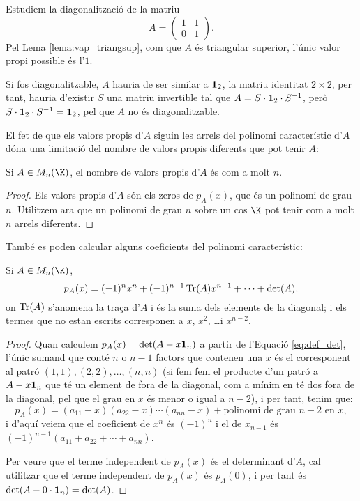 \begin{exemple}\label{exem:mat1101}
Estudiem la diagonalització de la matriu
$$
A=\begin{pmatrix}
1 &  1 \\ 0 & 1
\end{pmatrix}.
$$
Pel Lema \ref{lema:vap_triangsup}, com que $A$ és triangular superior, l'únic valor propi possible és l'$1$.

Si fos diagonalitzable, $A$ hauria de ser similar a $\mathbf{1}_2$, la matriu identitat $2\times 2$, per tant, hauria d'existir $S$ una matriu invertible tal que $A=S\cdot\mathbf{1}_2\cdot S^{-1}$, però $S\cdot \mathbf{1}_2 \cdot S^{-1}=\mathbf{1}_2$, pel que $A$ no és diagonalitzable.
\end{exemple}

El fet de que els valors propis d'$A$ siguin les arrels del polinomi característic d'$A$ dóna una limitació del nombre de valors propis diferents que pot tenir $A$:
\begin{lema}
Si $A\in M_n(\K)$, el nombre de valors propis d'$A$ és com a molt $n$.
\end{lema}
\begin{proof}
Els valors propis d'$A$ són els zeros de $p_A(x)$, que és un polinomi de grau $n$. Utilitzem ara que un polinomi de grau $n$ sobre un cos $\K$ pot tenir com a molt $n$ arrels diferents.
\end{proof}

També es poden calcular alguns coeficients del polinomi característic:
\begin{lema}
Si $A\in M_n(\K)$,
$$
p_A(x)=(-1)^{n} x^n + (-1)^{n-1}\operatorname{Tr}(A) x^{n-1} + \cdots + \det(A) ,
$$
on $\operatorname{Tr}(A)$ s'anomena la traça d'$A$ i és la suma dels elements de la diagonal; i els termes que no estan escrits corresponen a $x$, $x^2$, \ldots i $x^{n-2}$.
\end{lema}
\begin{proof}
Quan calculem $p_A(x)=\det(A-x\mathbf{1}_n)$ a partir de l'Equació \eqref{eq:def_det}, l'únic sumand que conté $n$ o $n-1$ factors que contenen una $x$ és el corresponent al patró $(1,1),(2,2),\dots, (n,n)$ (si fem fem el producte d'un patró a $A-x\mathbf{1}_n$ que té un element de fora de la diagonal, com a mínim en té dos fora de la diagonal, pel que el grau en $x$ és menor o igual a $n-2$), i per tant, tenim que:
$$
p_A(x)=(a_{11}-x)(a_{22}-x)\cdots(a_{nn}-x)+\text{polinomi de grau $n-2$ en $x$} ,
$$
i d'aquí veiem que el coeficient de $x^n$ és $(-1)^n$ i el de $x_{n-1}$ és $(-1)^{n-1}(a_{11}+a_{22}+\cdots + a_{nn})$.

Per veure que el terme independent de $p_A(x)$ és el determinant d'$A$, cal utilitzar que el terme independent de $p_A(x)$ és $p_A(0)$, i per tant és $\det(A-0\cdot\mathbf{1}_n)=\det(A)$.
\end{proof}

